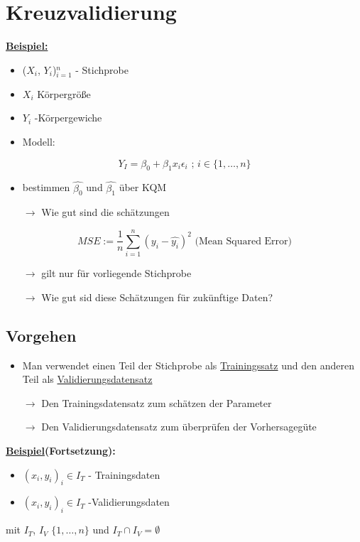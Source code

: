 \documentclass[10pt]{report}
\theoremstyle{definition}
\begin{document}
\section{Kreuzvalidierung}
\textbf{\underline{Beispiel:}}
	\begin{itemize}
		\item ($X_i$, $Y_i$)$_{i=1}^n$ - Stichprobe
		\item $X_i$ Körpergröße
		\item $Y_i$ -Körpergewiche
		\item Modell: 
	\end{itemize}
		\[Y_I = \beta_0 + \beta_1 x_i\epsilon_i \text{ ; } i \in \{1, \ldots,n\}\]
\begin{itemize}
\item bestimmen $\hat{\beta_0}$ und $\hat{\beta_1}$ über KQM
\item [\(\rightarrow\)] Wie gut sind die schätzungen
\end{itemize}


\[ MSE := \frac{1}{n} \sum_{i = 1}^{n} (y_i - \hat{y_i})^2 \text{  (Mean Squared Error)}\]

\begin{itemize}
	\item[\( \rightarrow \)] gilt nur für vorliegende Stichprobe
	\item[\( \rightarrow \)] Wie gut sid diese Schätzungen für zukünftige Daten?
\end{itemize}

\subsection{Vorgehen}
\begin{itemize}
	\item Man verwendet einen Teil der Stichprobe als \underline{Trainingssatz} und den anderen Teil als \underline{Validierungsdatensatz}
	\item[\( \rightarrow \)] Den Trainingsdatensatz zum schätzen der Parameter
	\item[\( \rightarrow \)] Den Validierungsdatensatz zum überprüfen der Vorhersagegüte
\end{itemize}

\textbf{\underline{Beispiel}(Fortsetzung):}
\begin{itemize}
	\item $(x_i, y_i)_i \in I_T$ - Trainingsdaten
	\item $(x_i,y_i)_i \in I_T$ -Validierungsdaten
\end{itemize}
mit $ I_T $, $ I_V $   $\{1,\ldots,n\}$   und $I_T \cap I_V = \emptyset$
	
\end{document}
